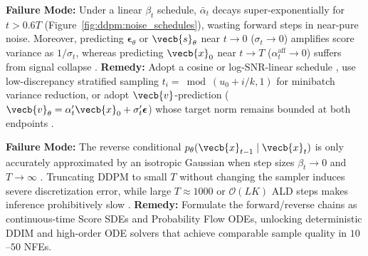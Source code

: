 \documentclass[../../../../master.tex]{subfiles}
\begin{document}
\begin{pitfall}
\textbf{Failure Mode:} Under a linear $\beta_t$ schedule, $\bar{\alpha}_t$ decays super-exponentially for $t > 0.6T$ (Figure~\ref{fig:ddpm:noise_schedules}), wasting forward steps in near-pure noise. Moreover, predicting $\boldsymbol{\epsilon}_\theta$ or $\vecb{s}_\theta$ near $t \to 0$ ($\sigma_t \to 0$) amplifies score variance as $1/\sigma_t$, whereas predicting $\vecb{x}_0$ near $t \to T$ ($\alpha_t^{\mathrm{aff}} \to 0$) suffers from signal collapse .
\textbf{Remedy:} Adopt a cosine or log-SNR-linear schedule , use low-discrepancy stratified sampling $t_i = \bmod(u_0 + i/k, 1)$ for minibatch variance reduction, or adopt $\vecb{v}$-prediction ($\vecb{v}_\theta = \alpha_t'\vecb{x}_0 + \sigma_t'\boldsymbol{\epsilon}$) whose target norm remains bounded at both endpoints .
\end{pitfall}

\begin{pitfall}
\textbf{Failure Mode:} The reverse conditional $p_\theta(\vecb{x}_{t-1} \mid \vecb{x}_t)$ is only accurately approximated by an isotropic Gaussian when step sizes $\beta_t \to 0$ and $T \to \infty$ . Truncating DDPM to small $T$ without changing the sampler induces severe discretization error, while large $T \approx 1000$ or $\mathcal{O}(LK)$ ALD steps makes inference prohibitively slow .
\textbf{Remedy:} Formulate the forward/reverse chains as continuous-time Score SDEs and Probability Flow ODEs, unlocking deterministic DDIM and high-order ODE solvers that achieve comparable sample quality in $10$--$50$ NFEs.
\end{pitfall}
\end{document}
